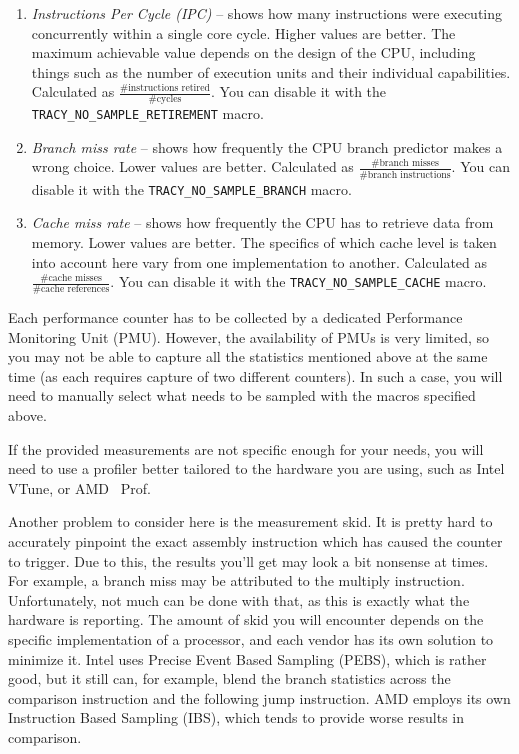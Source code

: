 \documentclass[hidelinks,titlepage,a4paper]{article}
\begin{document}
\begin{enumerate}
\item \emph{Instructions Per Cycle (IPC)} -- shows how many instructions were executing concurrently within a single core cycle. Higher values are better. The maximum achievable value depends on the design of the CPU, including things such as the number of execution units and their individual capabilities. Calculated as $\frac{\text{\#instructions retired}}{\text{\#cycles}}$. You can disable it with the \texttt{TRACY\_NO\_SAMPLE\_RETIREMENT} macro.
\item \emph{Branch miss rate} -- shows how frequently the CPU branch predictor makes a wrong choice. Lower values are better. Calculated as $\frac{\text{\#branch misses}}{\text{\#branch instructions}}$. You can disable it with the \texttt{TRACY\_NO\_SAMPLE\_BRANCH} macro.
\item \emph{Cache miss rate} -- shows how frequently the CPU has to retrieve data from memory. Lower values are better. The specifics of which cache level is taken into account here vary from one implementation to another. Calculated as $\frac{\text{\#cache misses}}{\text{\#cache references}}$. You can disable it with the \texttt{TRACY\_NO\_SAMPLE\_CACHE} macro.
\end{enumerate}

Each performance counter has to be collected by a dedicated Performance Monitoring Unit (PMU). However, the availability of PMUs is very limited, so you may not be able to capture all the statistics mentioned above at the same time (as each requires capture of two different counters). In such a case, you will need to manually select what needs to be sampled with the macros specified above.

If the provided measurements are not specific enough for your needs, you will need to use a profiler better tailored to the hardware you are using, such as Intel VTune, or AMD \si{\micro\relax}Prof.

Another problem to consider here is the measurement skid. It is pretty hard to accurately pinpoint the exact assembly instruction which has caused the counter to trigger. Due to this, the results you'll get may look a bit nonsense at times. For example, a branch miss may be attributed to the multiply instruction. Unfortunately, not much can be done with that, as this is exactly what the hardware is reporting. The amount of skid you will encounter depends on the specific implementation of a processor, and each vendor has its own solution to minimize it. Intel uses Precise Event Based Sampling (PEBS), which is rather good, but it still can, for example, blend the branch statistics across the comparison instruction and the following jump instruction. AMD employs its own Instruction Based Sampling (IBS), which tends to provide worse results in comparison.
\end{document}
